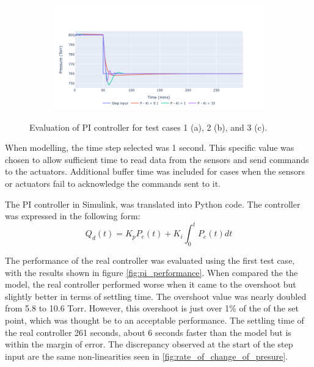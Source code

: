 \begin{figure}[h!]
    \bigskip
    \begin{subfigure}{0.8\linewidth}
        \centering
        \includegraphics[width=\linewidth]{chapter_5/figures/test_3_ki.png}
        \caption{}
    \end{subfigure}
    \caption{Evaluation of PI controller for test cases 1 (a), 2 (b), and 3 (c).}
    \label{fig:ki_results}
\end{figure}

When modelling, the time step selected was 1 second. This specific value was chosen to allow sufficient time to read data from the sensors and send commands to the actuators. Additional buffer time was included for cases when the sensors or actuators fail to acknowledge the commands sent to it.

The PI controller in Simulink, was translated into Python code. The controller was expressed in the following form:
\begin{equation}
    Q_d(t) = K_p P_e(t) + K_i \int_{0}^{t} P_e(t) dt
    \label{eq:pi_controller}
\end{equation} 

The performance of the real controller was evaluated using the first test case, with the results shown in figure \ref{fig:pi_performance}. When compared the the model, the real controller performed worse when it came to the overshoot but slightly better in terms of settling time. The overshoot value was nearly doubled from 5.8  to 10.6 Torr. However, this overshoot is just over 1\% of the of the set point, which was thought be to an acceptable performance. The settling time of the real controller 261 seconds, about 6 seconds faster than the model but is within the margin of error. The discrepancy observed at the start of the step input are the same non-linearities seen in \ref{fig:rate_of_change_of_presure}.


